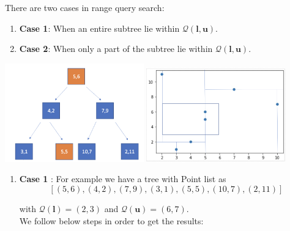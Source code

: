 There are two cases in range query search:
\begin{enumerate}
    \item\textbf{Case 1}: When an entire subtree lie within $\mathcal{Q}(\boldsymbol{l}, \boldsymbol{u})$.
    \item\textbf{Case 2}: When only a part of the subtree lie within $\mathcal{Q}(\boldsymbol{l}, \boldsymbol{u})$.
\end{enumerate}

\begin{mscexample}

    
    \begin{minipage}[t]{\linewidth}
    \centering
    \includegraphics[width=6cm]{graphs/Range_Query_Tree.png}
    \label{fig:KD-Tree_for_Range Query}
    \hfill
    \includegraphics[width=6cm]{graphs/Range_Query_plot.png}
    \label{fig:KD_Tree_Range_Query_Plot}
    \end{minipage}


    
\begin{enumerate}
    \item\textbf{Case 1} : For example we have a tree with Point list as 
	$$[(5,6),(4,2),(7,9),(3,1),(5,5),(10,7),(2,11)]$$
	
	 with $\mathcal{Q}(\boldsymbol{l}) = (2,3)$ and $\mathcal{Q}(\boldsymbol{u}) = (6,7)$. \\
	 We follow below steps in order to get the results:
	 \begin{enumerate}
	 

\end{enumerate}
\end{enumerate}
\end{mscexample}
